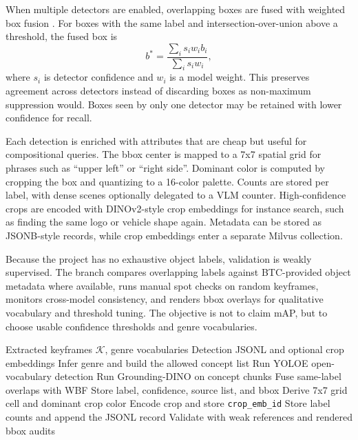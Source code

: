 \documentclass[conference]{IEEEtran}
\begin{document}
When multiple detectors are enabled, overlapping boxes are fused with weighted
box fusion \cite{solovyev2021wbf}. For boxes with the same label and
intersection-over-union above a threshold, the fused box is
\begin{equation}
b^\ast=\frac{\sum_i s_i w_i b_i}{\sum_i s_i w_i},
\end{equation}
where $s_i$ is detector confidence and $w_i$ is a model weight. This preserves
agreement across detectors instead of discarding boxes as non-maximum
suppression would. Boxes seen by only one detector may be retained with lower
confidence for recall.

Each detection is enriched with attributes that are cheap but useful for
compositional queries. The bbox center is mapped to a 7x7 spatial grid for
phrases such as ``upper left'' or ``right side''. Dominant color is computed by
cropping the box and quantizing to a 16-color palette. Counts are stored per
label, with dense scenes optionally delegated to a VLM counter. High-confidence
crops are encoded with DINOv2-style crop embeddings \cite{oquab2023dinov2} for
instance search, such as finding the same logo or vehicle shape again. Metadata
can be stored as JSONB-style records, while crop embeddings enter a separate
Milvus collection.

Because the project has no exhaustive object labels, validation is weakly
supervised. The branch compares overlapping labels against BTC-provided object
metadata where available, runs manual spot checks on random keyframes,
monitors cross-model consistency, and renders bbox overlays for qualitative
vocabulary and threshold tuning. The objective is not to claim mAP, but to
choose usable confidence thresholds and genre vocabularies.

\begin{algorithm}[!t]
\caption{Zero-shot object enrichment}
\label{alg:object-enrich}
\footnotesize
\begin{algorithmic}[1]
\Require Extracted keyframes $\mathcal{K}$, genre vocabularies
\Ensure Detection JSONL and optional crop embeddings
  \State Infer genre and build the allowed concept list
  \State Run YOLOE open-vocabulary detection
    \State Run Grounding-DINO on concept chunks
    \State Fuse same-label overlaps with WBF
  \EndIf
    \State Store label, confidence, source list, and bbox
    \State Derive 7x7 grid cell and dominant crop color
      \State Encode crop and store \texttt{crop\_emb\_id}
    \EndIf
  \EndFor
  \State Store label counts and append the JSONL record
\EndFor
\State Validate with weak references and rendered bbox audits
\end{algorithmic}
\end{algorithm}
\end{document}
